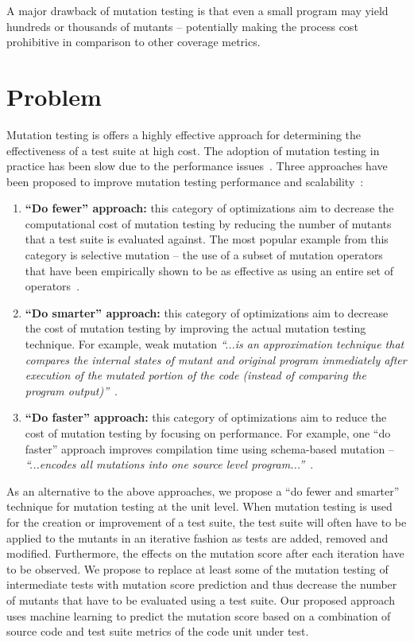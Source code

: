 A major drawback of mutation testing is that even a small program may yield hundreds or thousands of mutants -- potentially making the process cost prohibitive in comparison to other coverage metrics.


\section{Problem}
\label{sec:introduction_problem}
Mutation testing is offers a highly effective approach for determining the effectiveness of a test suite at high cost. The adoption of mutation testing in practice has been slow due to the performance issues~\cite{?}. Three approaches have been proposed to improve mutation testing performance and scalability~\cite{OU00}:

\begin{enumerate}
  \item \textbf{``Do fewer'' approach:} this category of optimizations aim to decrease the computational cost of mutation testing by reducing the number of mutants that a test suite is evaluated against. The most popular example from this category is selective mutation -- the use of a subset of mutation operators that have been empirically shown to be as effective as using an entire set of operators~\cite{OLR+96}.

  \item \textbf{``Do smarter'' approach:} this category of optimizations aim to decrease the cost of mutation testing by improving the actual mutation testing technique. For example, weak mutation \emph{``...is an approximation technique that compares the internal states of mutant and original program immediately after execution of the mutated portion of the code (instead of comparing the program output)''}~\cite{OU00}.

  \item \textbf{``Do faster'' approach:} this category of optimizations aim to reduce the cost of mutation testing by focusing on performance. For example, one ``do faster'' approach improves compilation time using schema-based mutation -- \emph{``...encodes all mutations into one source level program...''}~\cite{OU00}.
\end{enumerate}

As an alternative to the above approaches, we propose a ``do fewer and smarter'' technique for mutation testing at the unit level. When mutation testing is used for the creation or improvement of a test suite, the test suite will often have to be applied to the mutants in an iterative fashion as tests are added, removed and modified. Furthermore, the effects on the mutation score after each iteration have to be observed. We propose to replace at least some of the mutation testing of intermediate tests with mutation score prediction and thus decrease the number of mutants that have to be evaluated using a test suite. Our proposed approach uses machine learning to predict the mutation score based on a combination of source code and test suite metrics of the code unit under test.


